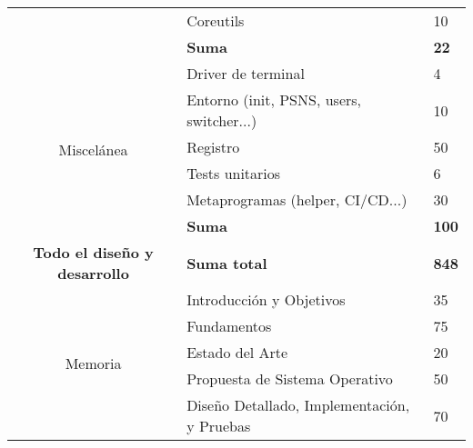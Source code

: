 \begin{table}[]
\begin{tabular}{|c|l|l|}
                                        & Coreutils                                       & 10                                            \\ \cline{2-3} 
                                        & \textbf{Suma}                                   & \textbf{22}                                   \\ \hline
\multirow{6}{*}{Miscelánea}             & Driver de terminal                              & 4                                             \\ \cline{2-3} 
                                        & Entorno (init, PSNS, users, switcher...)        & 10                                            \\ \cline{2-3} 
                                        & Registro                                        & 50                                            \\ \cline{2-3} 
                                        & Tests unitarios                                 & 6                                             \\ \cline{2-3} 
                                        & Metaprogramas (helper, CI/CD...)                & 30                                            \\ \cline{2-3} 
                                        & \textbf{Suma}                                   & \textbf{100}                                  \\ \hline
\textbf{Todo el diseño y desarrollo}    & \textbf{Suma total}                             & \textbf{848}                                  \\ \hline
\multirow{7}{*}{Memoria}                & Introducción y Objetivos                        & 35                                            \\ \cline{2-3} 
                                        & Fundamentos                                     & 75                                            \\ \cline{2-3} 
                                        & Estado del Arte                                 & 20                                            \\ \cline{2-3} 
                                        & Propuesta de Sistema Operativo                  & 50                                            \\ \cline{2-3} 
                                        & Diseño Detallado, Implementación, y Pruebas     & 70                                            \\ \cline{2-3} 

\end{tabular}
\end{table}
